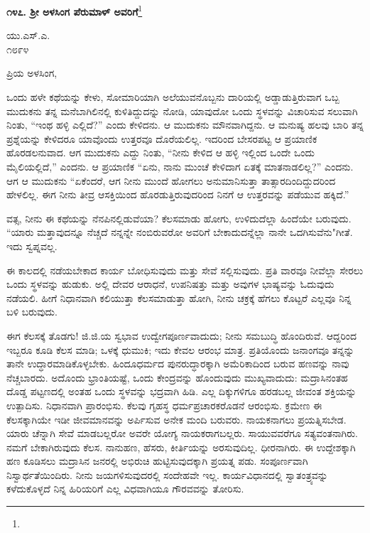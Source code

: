 \begin{center}
\textbf{೧೪೭. ಶ‍್ರೀ ಅಳಸಿಂಗ ಪೆರುಮಾಳ್ ಅವರಿಗೆ}\footnote{}
\end{center}

\vspace{-0.6cm}

\begin{flushright}
ಯು.ಎಸ್.ಎ.\\೧೮೯೪
\end{flushright}

\vspace{-0.5cm}

\noindent
ಪ್ರಿಯ ಅಳಸಿಂಗ,

ಒಂದು ಹಳೇ ಕಥೆಯನ್ನು ಕೇಳು, ಸೋಮಾರಿಯಾಗಿ ಅಲೆಯುವನೊಬ್ಬನು ದಾರಿಯಲ್ಲಿ ಅಡ್ಡಾಡುತ್ತಿರುವಾಗ ಒಬ್ಬ ಮುದುಕನು ತನ್ನ ಮನೆಬಾಗಿಲಿನಲ್ಲಿ ಕುಳಿತಿದ್ದುದನ್ನು ನೋಡಿ, ಯಾವುದೋ ಒಂದು ಸ್ಥಳವನ್ನು ವಿಚಾರಿಸುವ ಸಲುವಾಗಿ ನಿಂತು, ``ಇಂಥ ಹಳ್ಳಿ ಎಲ್ಲಿದೆ?'' ಎಂದು ಕೇಳಿದನು. ಆ ಮುದುಕನು ಮೌನವಾಗಿದ್ದನು. ಆ ಮನುಷ್ಯ ಹಲವು ಬಾರಿ ತನ್ನ ಪ್ರಶ್ನೆಯನ್ನು ಕೇಳಿದರೂ ಯಾವೊಂದು ಉತ್ತರವೂ ದೊರೆಯಲಿಲ್ಲ. ಇದರಿಂದ ಬೇಸರಪಟ್ಟ ಆ ಪ್ರಯಾಣಿಕ ಹೊರಡಲನುವಾದ. ಆಗ ಮುದುಕನು ಎದ್ದು ನಿಂತು, ``ನೀನು ಕೇಳಿದ ಆ ಹಳ್ಳಿ ಇಲ್ಲಿಂದ ಒಂದೇ ಒಂದು ಮೈಲಿಯಲ್ಲಿದೆ,'' ಎಂದನು. ಆ ಪ್ರಯಾಣಿಕ ``ಏನು, ನಾನು ಮುಂಚೆ ಕೇಳಿದಾಗ ಏತಕ್ಕೆ ಮಾತನಾಡಲಿಲ್ಲ?'' ಎಂದನು. ಆಗ ಆ ಮುದುಕನು “ಏಕೆಂದರೆ, ಆಗ ನೀನು ಮುಂದೆ ಹೋಗಲು ಅನುಮಾನಿಸುತ್ತಾ ತಾತ್ಸಾರದಿಂದಿದ್ದುದರಿಂದ ಹೇಳಲಿಲ್ಲ. ಈಗ ನೀನು ತೀವ್ರ ಆಸಕ್ತಿಯಿಂದ ಹೊರಡುತ್ತಿರುವುದರಿಂದ ನಿನಗೆ ಆ ಉತ್ತರವನ್ನು ಪಡೆಯುವ ಹಕ್ಕಿದೆ.''

ವತ್ಸ, ನೀನು ಈ ಕಥೆಯನ್ನು ನೆನಪಿನಲ್ಲಿಡುವೆಯಾ? ಕೆಲಸಮಾಡು ಹೋಗು, ಉಳಿದುದೆಲ್ಲಾ ಹಿಂದೆಯೇ ಬರುವುದು. ``ಯಾರು ಮತ್ತಾವುದನ್ನೂ ನೆಚ್ಚದೆ ನನ್ನನ್ನೇ ನಂಬಿರುವರೋ ಅವರಿಗೆ ಬೇಕಾದುದನ್ನೆಲ್ಲಾ ನಾನೇ ಒದಗಿಸುವೆನು"\enginline{-}ಗೀತೆ. ಇದು ಸ್ವಪ್ನವಲ್ಲ.

ಈ ಕಾಲದಲ್ಲಿ ನಡೆಯಬೇಕಾದ ಕಾರ್ಯ ಬೋಧಿಸುವುದು ಮತ್ತು ಸೇವೆ ಸಲ್ಲಿಸುವುದು. ಪ್ರತಿ ವಾರವೂ ನೀವೆಲ್ಲಾ ಸೇರಲು ಒಂದು ಸ್ಥಳವನ್ನು ಹುಡುಕು. ಅಲ್ಲಿ ದೇವರ ಆರಾಧನೆ, ಉಪನಿಷತ್ತು ಮತ್ತು ಅವುಗಳ ಭಾಷ್ಯವನ್ನು ಓದುವುದು ನಡೆಯಲಿ. ಹೀಗೆ ನಿಧಾನವಾಗಿ ಕಲಿಯುತ್ತಾ ಕೆಲಸಮಾಡುತ್ತಾ ಹೋಗಿ, ನೀನು ಚಕ್ರಕ್ಕೆ ಹೆಗಲು ಕೊಟ್ಟರೆ ಎಲ್ಲವೂ ನಿನ್ನ ಬಳಿ ಬರುವುದು.

ಈಗ ಕೆಲಸಕ್ಕೆ ತೊಡಗು! ಜಿ.ಜಿ.ಯ ಸ್ವಭಾವ ಉದ್ವೇಗಪೂರ್ಣವಾದುದು; ನೀನು ಸಮಬುದ್ಧಿ ಹೊಂದಿರುವೆ. ಆದ್ದರಿಂದ ಇಬ್ಬರೂ ಕೂಡಿ ಕೆಲಸ ಮಾಡಿ; ಒಳಕ್ಕೆ ಧುಮುಕಿ; ಇದು ಕೇವಲ ಆರಂಭ ಮಾತ್ರ. ಪ್ರತಿಯೊಂದು ಜನಾಂಗವೂ ತನ್ನನ್ನು ತಾನೇ ಉದ್ಧಾರಮಾಡಿಕೊಳ್ಳಬೇಕು. ಹಿಂದೂಧರ್ಮದ ಪುನರುದ್ಧಾರಕ್ಕಾಗಿ ಅಮೆರಿಕಾದಿಂದ ಬರುವ ಹಣವನ್ನು ನಾವು ನೆಚ್ಚಬಾರದು. ಅದೊಂದು ಭ್ರಾಂತಿಯಷ್ಟೆ, ಒಂದು ಕೇಂದ್ರವನ್ನು ಹೊಂದುವುದು ಮುಖ್ಯವಾದುದು: ಮದ್ರಾಸಿನಂತಹ ದೊಡ್ಡ ಪಟ್ಟಣದಲ್ಲಿ ಅಂತಹ ಒಂದು ಸ್ಥಳವನ್ನು ಭದ್ರವಾಗಿ ಹಿಡಿ. ಎಲ್ಲ ದಿಕ್ಕುಗಳಿಗೂ ಹರಡಬಲ್ಲ ಜೀವಂತ ಶಕ್ತಿಯನ್ನು ಉತ್ಪಾದಿಸು. ನಿಧಾನವಾಗಿ ಪ್ರಾರಂಭಿಸು. ಕೆಲವು ಗೃಹಸ್ಥ ಧರ್ಮಪ್ರಚಾರಕರೊಡನೆ ಆರಂಭಿಸು. ಕ್ರಮೇಣ ಈ ಕೆಲಸಕ್ಕಾಗಿಯೇ ಇಡೀ ಜೀವಮಾನವನ್ನು ಅರ್ಪಿಸುವ ಅನೇಕ ಮಂದಿ ಬರುವರು. ನಾಯಕನಾಗಲು ಪ್ರಯತ್ನಿಸಬೇಡ. ಯಾರು ಚೆನ್ನಾಗಿ ಸೇವೆ ಮಾಡಬಲ್ಲರೋ ಅವರೇ ಯೋಗ್ಯ ನಾಯಕರಾಗಬಲ್ಲರು. ಸಾಯುವವರೆಗೂ ಸತ್ಯವಂತನಾಗಿರು. ನಮಗೆ ಬೇಕಾಗಿರುವುದು ಕೆಲಸ. ನಾನುಹಣ, ಹೆಸರು, ಕೀರ್ತಿಯನ್ನು ಅರಸುವುದಿಲ್ಲ. ಧೀರನಾಗಿರು. ಈ ಉದ್ದೇಶಕ್ಕಾಗಿ ಹಣ ಕೂಡಿಸಲು ಮದ್ರಾಸಿನ ಜನರಲ್ಲಿ ಅಭಿರುಚಿ ಹುಟ್ಟಿಸುವುದಕ್ಕಾಗಿ ಪ್ರಯತ್ನ ಪಡು. ಸಂಪೂರ್ಣವಾಗಿ ನಿಸ್ವಾರ್ಥತೆಯಿಂದಿರು. ನೀನು ಜಯಗಳಿಸುವುದರಲ್ಲಿ ಸಂದೇಹವೇ ಇಲ್ಲ. ಕಾರ್ಯವಿಧಾನದಲ್ಲಿ ಸ್ವಾತಂತ್ರ್ಯವನ್ನು ಕಳೆದುಕೊಳ್ಳದೆ ನಿನ್ನ ಹಿರಿಯರಿಗೆ ಎಲ್ಲ ವಿಧವಾಗಿಯೂ ಗೌರವವನ್ನು ತೋರಿಸು.

